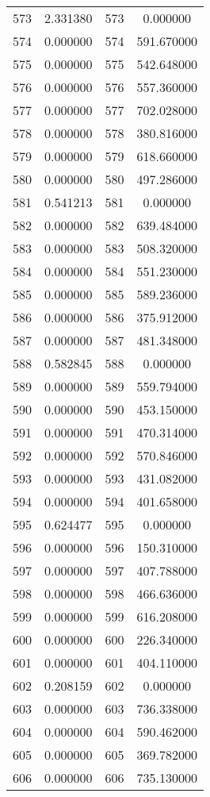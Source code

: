 \documentclass[12pt]{article}
\begin{document}
\begin{longtable}{@{}cccc@{}}
573 & 2.331380 & 573 & 0.000000 \\
574 & 0.000000 & 574 & 591.670000 \\
575 & 0.000000 & 575 & 542.648000 \\
576 & 0.000000 & 576 & 557.360000 \\
577 & 0.000000 & 577 & 702.028000 \\
578 & 0.000000 & 578 & 380.816000 \\
579 & 0.000000 & 579 & 618.660000 \\
580 & 0.000000 & 580 & 497.286000 \\
581 & 0.541213 & 581 & 0.000000 \\
582 & 0.000000 & 582 & 639.484000 \\
583 & 0.000000 & 583 & 508.320000 \\
584 & 0.000000 & 584 & 551.230000 \\
585 & 0.000000 & 585 & 589.236000 \\
586 & 0.000000 & 586 & 375.912000 \\
587 & 0.000000 & 587 & 481.348000 \\
588 & 0.582845 & 588 & 0.000000 \\
589 & 0.000000 & 589 & 559.794000 \\
590 & 0.000000 & 590 & 453.150000 \\
591 & 0.000000 & 591 & 470.314000 \\
592 & 0.000000 & 592 & 570.846000 \\
593 & 0.000000 & 593 & 431.082000 \\
594 & 0.000000 & 594 & 401.658000 \\
595 & 0.624477 & 595 & 0.000000 \\
596 & 0.000000 & 596 & 150.310000 \\
597 & 0.000000 & 597 & 407.788000 \\
598 & 0.000000 & 598 & 466.636000 \\
599 & 0.000000 & 599 & 616.208000 \\
600 & 0.000000 & 600 & 226.340000 \\
601 & 0.000000 & 601 & 404.110000 \\
602 & 0.208159 & 602 & 0.000000 \\
603 & 0.000000 & 603 & 736.338000 \\
604 & 0.000000 & 604 & 590.462000 \\
605 & 0.000000 & 605 & 369.782000 \\
606 & 0.000000 & 606 & 735.130000 \\

\end{longtable}
\end{document}

